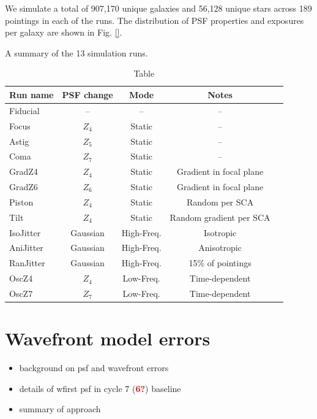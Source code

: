 \documentclass[aps,prd, amsmath,amssymb,superscriptaddress,showkeys,nofootinbib,reprint,preprintnumbers]{revtex4-1}
\newcommand{\verify}[1]{\textcolor{red}{\textbf{{#1}}}}
\begin{document}
We simulate a total of 907,170 unique galaxies and 56,128 unique stars across 189 pointings in each of the runs. The distribution of PSF properties and exposures per galaxy are shown in Fig. \ref{}.

\def\arraystretch{1.4}
\setlength{\tabcolsep}{4pt}
\begin{table}
\caption{Table} A summary of the 13 simulation runs.
\label{table:values}
\begin{center}
\begin{tabular}{lcccc }
\hline
\hline
Run name & PSF change & Mode & Notes \\ 
\hline
Fiducial              & -- & -- & -- \\
Focus                & $Z_4$ & Static & --  \\
Astig                  & $Z_5$ & Static &  -- \\
Coma                & $Z_7$ & Static &  -- \\
GradZ4             & $Z_4$ & Static & Gradient in focal plane  \\
GradZ6              & $Z_6$ & Static &Gradient in focal plane    \\
Piston 		 & $Z_4$ & Static  &Random per SCA   \\
Tilt 			 & $Z_4$ & Static & Random gradient per SCA \\
IsoJitter 		& Gaussian  & High-Freq. & Isotropic  \\
AniJitter 		 & Gaussian & High-Freq. & Anisotropic  \\
RanJitter 		 & Gaussian & High-Freq. & 15\% of pointings  \\
OscZ4 		 & $Z_4$ & Low-Freq. & Time-dependent  \\
OscZ7 		 & $Z_7$ & Low-Freq. & Time-dependent  \\
\hline
\hline
\end{tabular}
\end{center}
\end{table}


\section{Wavefront model errors}\label{sec:results}

\begin{itemize}
\item background on psf and wavefront errors
\item details of wfirst psf in cycle 7 (\verify{6?}) baseline
\item summary of approach 
\end{itemize}
\end{document}
